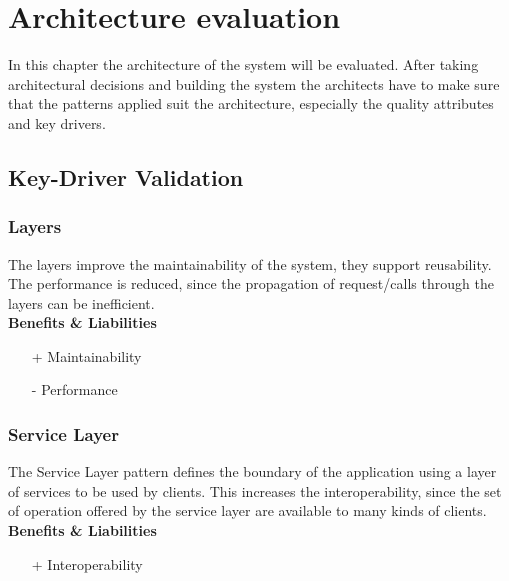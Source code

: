 
\newcommand{\bo}[1]{\textbf{#1}}

\chapter{Architecture evaluation}
\label{ch:evaluation}

In this chapter the architecture of the system will be evaluated. After taking architectural decisions and building the system the architects have to make sure that the patterns applied suit the architecture, especially the quality attributes and key drivers.%

\section{Key-Driver Validation}

\subsection*{Layers}
The layers improve the maintainability of the system, they support reusability.
The performance is reduced, since the propagation of request/calls through the layers can be inefficient.\\
\textbf{Benefits \& Liabilities} ~
\begin{itemize}
\item[+] Maintainability
\item[-] Performance 
\end{itemize}

\subsection*{Service Layer}
The Service Layer pattern defines the boundary of the application using a layer of services to be used by clients. This increases the interoperability, since the set of operation offered by the service layer are available to many kinds of clients. \\
\textbf{Benefits \& Liabilities} ~
\begin{itemize}
\item[+] Interoperability 
\end{itemize}

